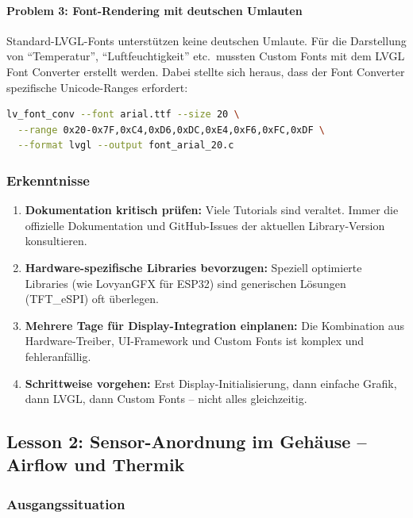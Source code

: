 \paragraph{Problem 3: Font-Rendering mit deutschen Umlauten}
Standard-LVGL-Fonts unterstützen keine deutschen Umlaute. Für die Darstellung von "`Temperatur"', "`Luftfeuchtigkeit"' etc.\ mussten Custom Fonts mit dem LVGL Font Converter erstellt werden. Dabei stellte sich heraus, dass der Font Converter spezifische Unicode-Ranges erfordert:

\begin{lstlisting}[language=bash,numbers=none,caption={Font-Generierung mit Umlauten}]
lv_font_conv --font arial.ttf --size 20 \
  --range 0x20-0x7F,0xC4,0xD6,0xDC,0xE4,0xF6,0xFC,0xDF \
  --format lvgl --output font_arial_20.c
\end{lstlisting}

\subsubsection{Erkenntnisse}

\begin{enumerate}[nosep]
\item \textbf{Dokumentation kritisch prüfen:} Viele Tutorials sind veraltet. Immer die offizielle Dokumentation und GitHub-Issues der aktuellen Library-Version konsultieren.
\item \textbf{Hardware-spezifische Libraries bevorzugen:} Speziell optimierte Libraries (wie LovyanGFX für ESP32) sind generischen Lösungen (TFT\_eSPI) oft überlegen.
\item \textbf{Mehrere Tage für Display-Integration einplanen:} Die Kombination aus Hardware-Treiber, UI-Framework und Custom Fonts ist komplex und fehleranfällig.
\item \textbf{Schrittweise vorgehen:} Erst Display-Initialisierung, dann einfache Grafik, dann LVGL, dann Custom Fonts -- nicht alles gleichzeitig.
\end{enumerate}

\subsection{Lesson 2: Sensor-Anordnung im Gehäuse -- Airflow und Thermik}
\label{sec:lesson_gehaeuse}

\subsubsection{Ausgangssituation}

